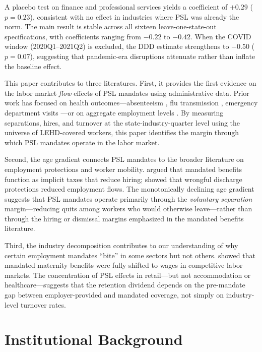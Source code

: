 \documentclass[12pt]{article}
\begin{document}
A placebo test on finance and professional services yields a coefficient of $+0.29$ ($p = 0.23$), consistent with no effect in industries where PSL was already the norm. The main result is stable across all sixteen leave-one-state-out specifications, with coefficients ranging from $-0.22$ to $-0.42$. When the COVID window (2020Q1--2021Q2) is excluded, the DDD estimate strengthens to $-0.50$ ($p = 0.07$), suggesting that pandemic-era disruptions attenuate rather than inflate the baseline effect.

This paper contributes to three literatures. First, it provides the first evidence on the labor market \textit{flow} effects of PSL mandates using administrative data. Prior work has focused on health outcomes---absenteeism \citep{pichler2017}, flu transmission \citep{pichler2020contagion}, emergency department visits \citep{colla2014}---or on aggregate employment levels \citep{ahn2020}. By measuring separations, hires, and turnover at the state-industry-quarter level using the universe of LEHD-covered workers, this paper identifies the margin through which PSL mandates operate in the labor market.

Second, the age gradient connects PSL mandates to the broader literature on employment protections and worker mobility. \citet{lazear1990} argued that mandated benefits function as implicit taxes that reduce hiring; \citet{autor2003} showed that wrongful discharge protections reduced employment flows. The monotonically declining age gradient suggests that PSL mandates operate primarily through the \textit{voluntary separation} margin---reducing quits among workers who would otherwise leave---rather than through the hiring or dismissal margins emphasized in the mandated benefits literature.

Third, the industry decomposition contributes to our understanding of why certain employment mandates ``bite'' in some sectors but not others. \citet{gruber1994} showed that mandated maternity benefits were fully shifted to wages in competitive labor markets. The concentration of PSL effects in retail---but not accommodation or healthcare---suggests that the retention dividend depends on the pre-mandate gap between employer-provided and mandated coverage, not simply on industry-level turnover rates.

\section{Institutional Background}
\end{document}

